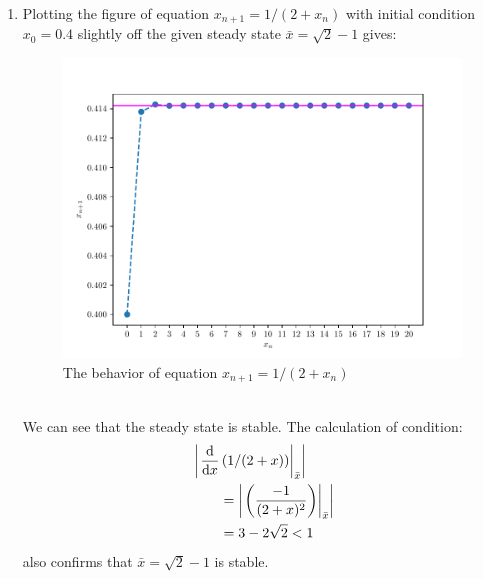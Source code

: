 \begin{homeworkProblem}[2]
\begin{enumerate}
\item Plotting the figure of equation $x_{n+1} = 1/(2+x_n)$ with initial 
condition $x_0 = 0.4$ slightly off the given steady state $\bar x = \sqrt{2} 
- 1$ gives:
\begin{figure}
    \centering
    \caption{The behavior of equation $x_{n+1} = 1/(2+x_n)$}
    \includegraphics[scale=0.6]{../fig/fig2(c)}
\end{figure}
\\
We can see that the steady state is stable. The calculation of condition:
\[
    \begin{aligned}
        &\left|\left.\frac{\mathrm{d}}{\mathrm{d}x} \left(1/(2+x)\right)\right|_{\bar x}\right|\\
        &\qquad = \left| \left.\left(\frac{-1}{(2+x)^2}\right)\right|_{\bar x} 
        \right|\\
        &\qquad = 3 - 2\sqrt{2} < 1
    \end{aligned}
\]
also confirms that $\bar x = \sqrt{2} - 1$ is stable.


\end{enumerate}
\end{homeworkProblem}
